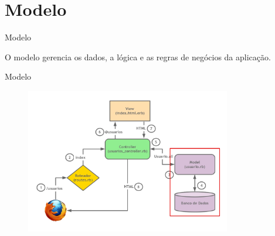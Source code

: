 \section{Modelo}
\begin{frame}[c, fragile]{Modelo}
	\begin{center}
		O modelo gerencia os \alert{dados}, a \alert{lógica} e as \alert{regras de negócios} da aplicação.
	\end{center}
\end{frame}

\begin{frame}[c, fragile]{Modelo}
	\begin{figure}[h!]
		\centering
		\includegraphics[width=0.80\textwidth]{imagens/mvc-model.jpg}
	\end{figure}
\end{frame}